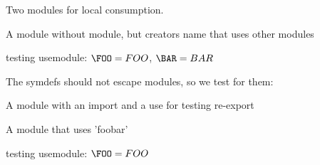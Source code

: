 \documentclass[minimal]{omdoc}
\begin{document}
Two modules for local consumption.
 

A module without module, but creators name that uses other modules
\begin{module}[creators=miko]
  testing usemodule: $\FOO=FOO$, $\BAR=BAR$  
\end{module}

The symdefs should not escape modules, so we test for them:
\ifx\FOO\undefined\else{}\fi

A module with an import and a use for testing re-export
\begin{module}[id=foobar]
\end{module}

A module  that uses 'foobar'
\begin{module}
  testing usemodule: $\FOO=FOO$
  \ifx\BAR\undefined\else{}\fi
\end{module}
\end{document}
